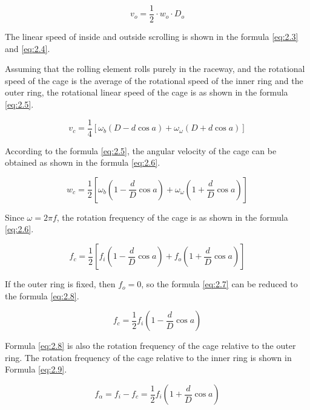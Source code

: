 \documentclass{article}
\begin{document}
\begin{equation}
    v_o = \frac{1}{2} \cdot w_o \cdot D_o
    \label{eq:2.4}
\end{equation}

The linear speed of inside and outside scrolling is shown in the formula \ref{eq:2.3} and \ref{eq:2.4}.

Assuming that the rolling element rolls purely in the raceway, and the rotational speed of the cage is the average of the rotational speed of the inner ring and the outer ring, the rotational linear speed of the cage is as shown in the formula \ref{eq:2.5}.

\begin{equation}
    v_c = \frac{1}{4} [\omega_b (D - d \cos a) + \omega_\omega (D + d \cos a)]
    \label{eq:2.5}
\end{equation}

According to the formula \ref{eq:2.5}, the angular velocity of the cage can be obtained as shown in the formula \ref{eq:2.6}.

\begin{equation}
    w_c = \frac{1}{2} \left[ \omega_b \left( 1 - \frac{d}{D} \cos a \right) + \omega_\omega \left( 1 + \frac{d}{D} \cos a \right) \right]
    \label{eq:2.6}
\end{equation}

Since $\omega = 2 \pi f$, the rotation frequency of the cage is as shown in the formula \ref{eq:2.6}.

\begin{equation}
    f_c = \frac{1}{2} \left[ f_i \left( 1 - \frac{d}{D} \cos a \right) + f_o \left( 1 + \frac{d}{D} \cos a \right) \right]
    \label{eq:2.7}
\end{equation}

If the outer ring is fixed, then $f_o = 0$, so the formula \ref{eq:2.7} can be reduced to the formula \ref{eq:2.8}.

\begin{equation}
    f_c = \frac{1}{2} f_i \left( 1 - \frac{d}{D} \cos a \right)
    \label{eq:2.8}
\end{equation}

Formula \ref{eq:2.8} is also the rotation frequency of the cage relative to the outer ring. The rotation frequency of the cage relative to the inner ring is shown in Formula \ref{eq:2.9}.

\begin{equation}
    f_\alpha = f_i - f_c = \frac{1}{2} f_i \left( 1 + \frac{d}{D} \cos a \right)
    \label{eq:2.9}
\end{equation}
\end{document}

